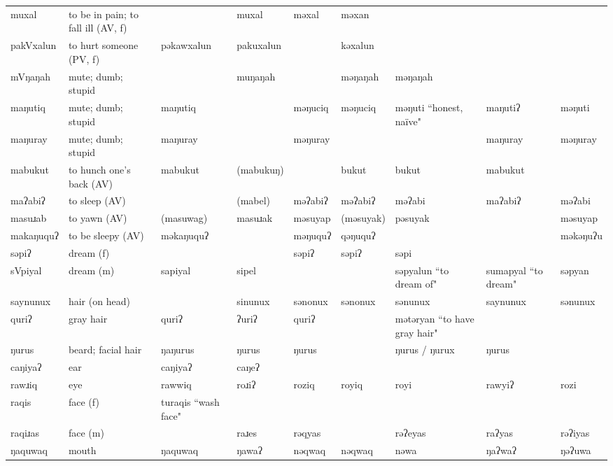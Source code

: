 \begin{landscape}
\begin{longtable}{*{9}{>{\raggedright\arraybackslash}p{}}}
\text{*}muxal & to be in pain; to fall ill (AV, f) &  & muxal & məxal & məxan &  &  & \\
\text{*}pakVxalun & to hurt someone (PV, f) & pəkawxalun & pakuxalun &  & kəxalun &  &  & \\
\text{*}mVŋaŋah & mute; dumb; stupid &  & muŋaŋah &  & məŋaŋah & məŋaŋah &  & \\
\text{*}maŋutiq & mute; dumb; stupid & maŋutiq &  & məŋuciq & məŋuciq & məŋuti ``honest, naïve" & maŋutiʔ & məŋuti\\
\text{*}maŋuray & mute; dumb; stupid & maŋuray &  & məŋuray &  &  & maŋuray & məŋuray\\
\text{*}mabukut & to hunch one's back (AV) & mabukut & (mabukuŋ) &  & bukut & bukut & mabukut & \\
\text{*}maʔabiʔ & to sleep (AV) &  & (mabel) & məʔabiʔ & məʔabiʔ & məʔabi & maʔabiʔ & məʔabi\\
\text{*}masuɹab & to yawn (AV) & (masuwag) & masuɹak & məsuyap & (məsuyak) & pəsuyak &  & məsuyap\\
\text{*}makaŋuquʔ & to be sleepy (AV) & məkaŋuquʔ &  & məŋuquʔ & qəŋuquʔ &  &  & məkəŋuʔu\\
\text{*}səpiʔ & dream (f) &  &  & səpiʔ & səpiʔ & səpi &  & \\
\text{*}sVpiyal & dream (m) & sapiyal & sipel &  &  & səpyalun \newline ``to dream of" & sumapyal \newline ``to dream" & səpyan\\
\text{*}saynunux & hair (on head) &  & sinunux & sənonux & sənonux & sənunux & saynunux & sənunux\\
\text{*}quriʔ & gray hair & quriʔ & ʔuriʔ & quriʔ &  & mətəryan \newline ``to have gray hair" &  & \\
\text{*}ŋurus & beard; facial hair & ŋaŋurus & ŋurus & ŋurus &  & ŋurus / ŋurux & ŋurus & \\
\text{*}caŋiyaʔ & ear & caŋiyaʔ & caŋeʔ &  &  &  &  & \\
\text{*}rawɹiq & eye & rawwiq & roɹiʔ & roziq & royiq & royi & rawyiʔ & rozi\\
\text{*}raqis & face (f) & turaqis \newline ``wash face" &  &  &  &  &  & \\
\text{*}raqiɹas & face (m) &  & raɹes & rəqyas &  & rəʔeyas & raʔyas & rəʔiyas\\
\text{*}ŋaquwaq & mouth & ŋaquwaq & ŋawaʔ & nəqwaq & nəqwaq & nəwa & ŋaʔwaʔ & ŋəʔuwa\\

\end{longtable}
\end{landscape}
